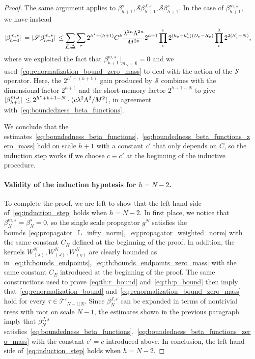 \documentclass[a4paper, 11pt]{article}
\newcommand{\cutoff}{\Lambda}								%
\newcommand{\sing}[2]{{#1}^{#2}}							%
\newcommand{\trees}{\mathcal{T}}							%
\theoremstyle{thm}
\begin{document}
\begin{proof}
The same argument applies to $\beta^s_{h+1}, \mathscr{S} \beta^{J, s}_{h+1}, \mathscr{S} \beta^s_{h+1}$. In the case of $\beta^{m, s}_{h+1}$, we have instead
\begin{equation}
\abs*{\beta^{m, s}_{h+1}} = \abs*{\mathscr{S} \beta^{m, s}_{h+1}} \le \sum_{\underline{P}, \underline{\Delta}} \sum_\tau 2^{h^\star - (h+1)} C^k \frac{\lambda^{2n} \cutoff^{2n}}{M^{2n}} 2^{h+1} \prod^\circ_v 2^{(h_v - h'_v)(D_v - R_v)} \prod_v^\lambda 2^{2(h'_v - N)},
\end{equation}
where we exploited the fact that $\beta^{m, s}_{h+1} \vert_{m_N = 0} = 0$ and we used~\eqref{eq:renormalization_bound_zero_mass} to deal with the action of the $\mathscr{S}$ operator. Here, the $2^{h^\star - (h+1)}$ gain produced by $\mathscr{S}$ combines with the dimensional factor $2^{h+1}$ and the short-memory factor $2^{h+1 -N}$ to give $\abs*{\beta_{h+1}^{m, s}} \le 2^{h^\star + h+1 - N} \cdot (c \lambda^2 \cutoff^2/M^2)$, in agreement with~\eqref{eq:boundedness_beta_functions}.

We conclude that the estimates~\eqref{eq:boundedness_beta_functions},~\eqref{eq:boundedness_beta_functions_zero_mass} hold on scale $h+1$ with a constant $c'$ that only depends on $C$, so the induction step works if we choose $c \equiv c'$ at the beginning of the inductive procedure.

\paragraph{Validity of the induction hypotesis for $h = N-2$.} To complete the proof, we are left to show that the left hand side of~\eqref{eq:induction_step} holds when $h = N - 2$. In first place, we notice that $\beta^{m, s}_N = \beta^s_N = 0$, so the single scale propagator $\sing{g}{N}$ satisfies the bounds~\eqref{eq:propagator_L_infty_norm},~\eqref{eq:propagator_weighted_norm} with the same constant $C_H$ defined at the beginning of the proof. In addition, the kernels $\sing{W}{N}_{(\lambda)}, \sing{W}{N}_{(J)}, \sing{W}{N}_{(\eta)}$ are clearly bounded as in~\eqref{eq:th:bounds_endpoints},~\eqref{eq:th:bounds_endpoints_zero_mass} with the same constant $C_E$ introduced at the beginning of the proof. The same constructions used to prove~\eqref{eq:th:r_bound} and~\eqref{eq:th:p_bound} then imply that~\eqref{eq:renormalization_bound} and~\eqref{eq:renormalization_bound_zero_mass} hold for every $\tau \in \trees'_{N-1|N}$. Since $\beta^{J, s}_N$ can be expanded in terms of nontrivial trees with root on scale $N-1$, the estimates shown in the previous paragraph imply that $\beta^{J, s}_N$ satisfies~\eqref{eq:boundedness_beta_functions},~\eqref{eq:boundedness_beta_functions_zero_mass} with the constant $c' = c$ introduced above. In conclusion, the left hand side of~\eqref{eq:induction_step} holds when $h = N - 2$.
\end{proof}
\end{document}
